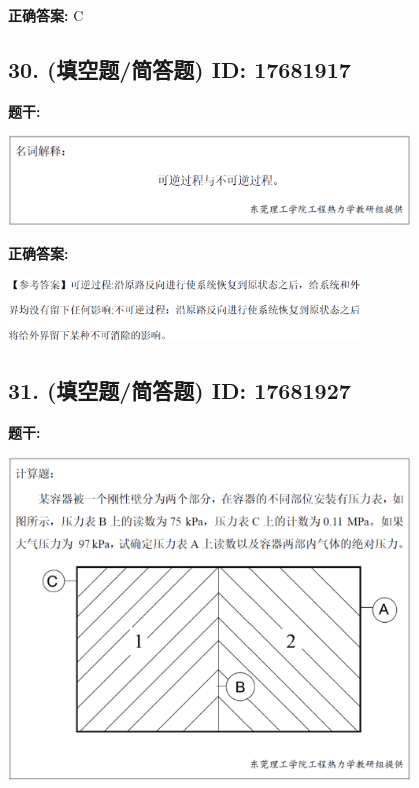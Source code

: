 \documentclass[12pt]{article}
\begin{document}
\textbf{正确答案:}
C

\vspace{0.5em}\hrulefill\vspace{1em}

\subsection*{30. (填空题/简答题) \small ID: 17681917}

\textbf{题干:}


\begin{center}\includegraphics[width=0.8\textwidth, height=0.25\textheight, keepaspectratio]{question_30_17681917/title_img_1.png}\end{center}

\textbf{正确答案:}

\begin{center}\includegraphics[width=0.7\textwidth, height=0.2\textheight, keepaspectratio]{question_30_17681917/correct_answer_1_img_1.png}\end{center}

\vspace{0.5em}\hrulefill\vspace{1em}

\subsection*{31. (填空题/简答题) \small ID: 17681927}

\textbf{题干:}


\begin{center}\includegraphics[width=0.8\textwidth, height=0.25\textheight, keepaspectratio]{question_31_17681927/title_img_1.png}\end{center}
\end{document}
